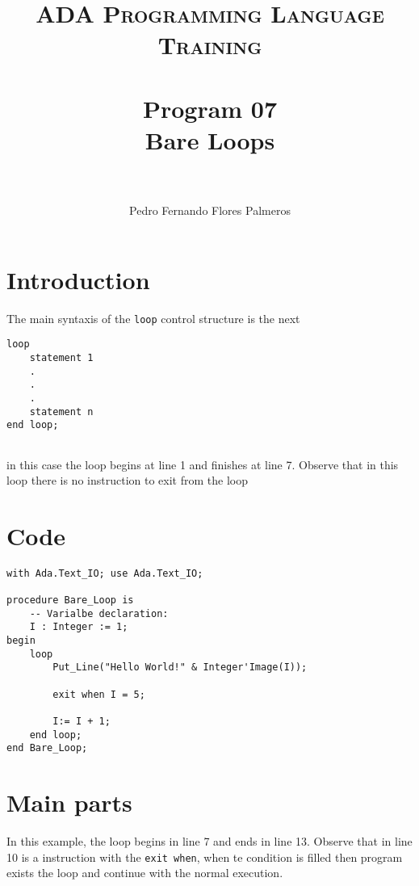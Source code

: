 \documentclass[paper=a4, fontsize=11pt]{scrartcl} %
\title{	
\normalfont \normalsize 
\textsc{ADA Programming Language Training} \\ [25pt] %
\horrule{0.5pt} \\[0.4cm] %
\huge Program 07\\ Bare Loops\\ %
\horrule{2pt} \\[0.5cm] %
}
\author{Pedro Fernando Flores Palmeros} %
\date{} %
\numberwithin{equation}{section} %
\numberwithin{figure}{section} %
\numberwithin{table}{section} %
\begin{document}
\maketitle %
 

\section{Introduction}
The main syntaxis of the \verb|loop| control structure is the next

\begin{lstlisting}
loop 
	statement 1
	.
	.
	.
	statement n
end loop;
	
\end{lstlisting}
in this case the loop begins at line 1 and finishes at line 7. Observe that in this loop there is no instruction to exit from the loop

\section{Code}
\begin{lstlisting}
with Ada.Text_IO; use Ada.Text_IO;

procedure Bare_Loop is 
    -- Varialbe declaration: 
    I : Integer := 1;
begin
    loop 
        Put_Line("Hello World!" & Integer'Image(I));

        exit when I = 5; 

        I:= I + 1;
    end loop;
end Bare_Loop;
\end{lstlisting}

\section{Main parts}

In this example, the loop begins in line 7 and ends in line 13. Observe that in line 10 is a instruction with the \verb|exit when|, when te condition is filled then program exists the loop and continue with the normal execution.
\end{document}
